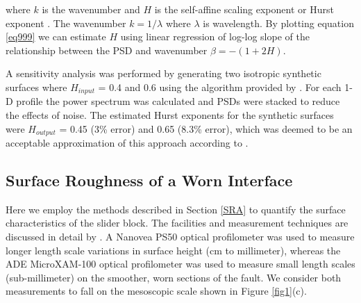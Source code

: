 \documentclass[draft]{agujournal2019}
\begin{document}
\noindent where $k$ is the wavenumber and $H$ is the self-affine scaling exponent or Hurst exponent \cite{Schmittbuhl2003, Candela2009, Mai2002}. The wavenumber $k = 1/\lambda$ where $\lambda$ is wavelength. By plotting equation \eqref{eq999} we can estimate $H$ using linear regression of log-log slope of the relationship between the PSD and wavenumber $\beta =-(1+2H)$.  

A sensitivity analysis was performed by generating two isotropic synthetic surfaces where $H_{input}$ = 0.4 and 0.6 using the algorithm provided by .  For each 1-D profile the power spectrum was calculated and PSDs were stacked to reduce the effects of noise.  The estimated Hurst exponents for the synthetic surfaces were $H_{output}$ = 0.45 (3\% error) and 0.65 (8.3\% error), which was deemed to be an acceptable approximation of this approach according to .  

\subsection{Surface Roughness of a Worn Interface}
\label{SurfaceRoughnessResults}

Here we employ the methods described in Section \ref{SRA} to quantify the surface characteristics of the slider block. The facilities and measurement techniques are discussed in detail by . A Nanovea PS50 optical profilometer was used to measure longer length scale variations in surface height (cm to millimeter), whereas the ADE MicroXAM-100 optical profilometer was used to measure small length scales (sub-millimeter) on the smoother, worn sections of the fault. We consider both measurements to fall on the mesoscopic scale shown in Figure \ref{fig1}(c).
\end{document}
